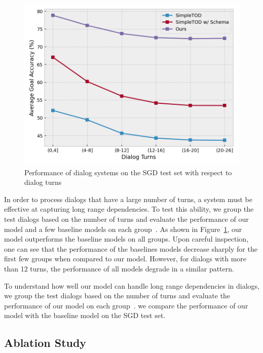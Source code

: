 \begin{figure}
    \centering
    \includegraphics[width=\linewidth]{assets/dialog_turns.png}
    \caption{
        Performance of dialog systems on the SGD test set with respect to dialog turns
    }
    \label{fig:dialog_turns}
\end{figure}

In order to process dialogs that have a large number of turns, a system must be effective at capturing long range dependencies.
To test this ability, we group the test dialogs based on the number of turns and evaluate the performance of our model and a few baseline models on each group~\cite{sun2022mars}.
As shown in Figure~\ref{fig:dialog_turns}, our model outperforms the baseline models on all groups. Upon careful inspection, one can see that
the performance of the baselines models decrease sharply for the first few groups when compared to our model. However, for dialogs with more than 12 turns,
the performance of all models degrade in a similar pattern.

To understand how well our model can handle long range dependencies in dialogs, we group the test dialogs based on the number of turns and
evaluate the performance of our model on each group~\cite{sun2022mars}.
we compare the performance of our model with the baseline model on the SGD test set.


\subsection{Ablation Study}

